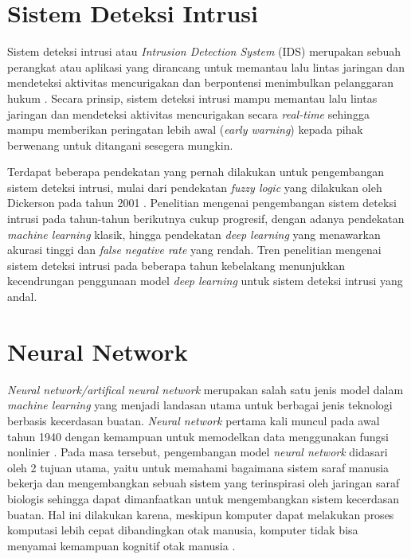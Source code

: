 \documentclass[a4paper,12pt]{report}
\begin{document}
\section{Sistem Deteksi Intrusi}

Sistem deteksi intrusi atau \textit{Intrusion Detection System} (IDS) merupakan sebuah perangkat atau aplikasi yang dirancang untuk memantau lalu lintas jaringan dan mendeteksi aktivitas mencurigakan dan berpontensi menimbulkan pelanggaran hukum \cite{solomonIntrusionDetectionSystem2019}. Secara prinsip, sistem deteksi intrusi mampu memantau lalu lintas jaringan dan mendeteksi aktivitas mencurigakan secara \textit{real-time} sehingga mampu memberikan peringatan lebih awal (\textit{early warning}) kepada pihak berwenang untuk ditangani sesegera mungkin. 

Terdapat beberapa pendekatan yang pernah dilakukan untuk pengembangan sistem deteksi intrusi, mulai dari pendekatan \textit{fuzzy logic} yang dilakukan oleh Dickerson pada tahun 2001 \cite{dickersonFuzzyIntrusionDetection2001}. Penelitian mengenai pengembangan sistem deteksi intrusi pada tahun-tahun berikutnya cukup progresif, dengan adanya pendekatan \textit{machine learning} klasik, hingga pendekatan \textit{deep learning} yang menawarkan akurasi tinggi dan \textit{false negative rate} yang rendah. Tren penelitian mengenai sistem deteksi intrusi pada beberapa tahun kebelakang menunjukkan kecendrungan penggunaan model \textit{deep learning} untuk sistem deteksi intrusi yang andal.

\section{Neural Network}

 \textit{Neural network/artifical neural network} merupakan salah satu jenis model dalam \textit{machine learning} yang menjadi landasan utama untuk berbagai jenis teknologi berbasis kecerdasan buatan. \textit{Neural network} pertama kali muncul pada awal tahun 1940 dengan kemampuan untuk memodelkan data menggunakan fungsi nonlinier \cite{qamarArtificialNeuralNetworks2023}. Pada masa tersebut, pengembangan model \textit{neural network} didasari oleh 2 tujuan utama, yaitu untuk memahami bagaimana sistem saraf manusia bekerja dan mengembangkan sebuah sistem yang terinspirasi oleh jaringan saraf biologis sehingga dapat dimanfaatkan untuk mengembangkan sistem kecerdasan buatan. Hal ini dilakukan karena, meskipun komputer dapat melakukan proses komputasi lebih cepat dibandingkan otak manusia, komputer tidak bisa menyamai kemampuan kognitif otak manusia \cite{prietoNeuralNetworksOverview2016}.
\end{document}
